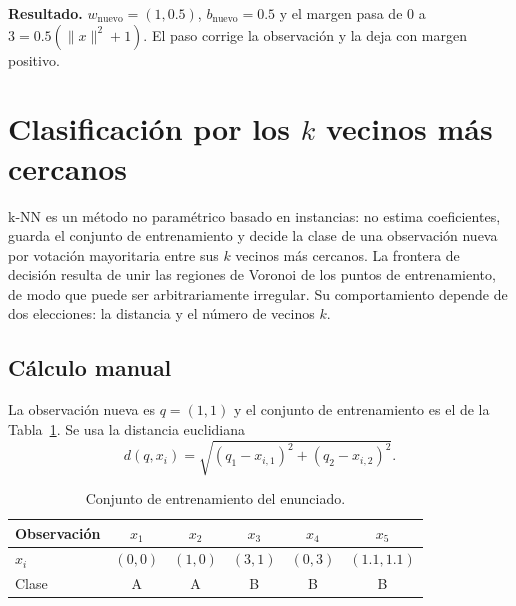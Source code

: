 \documentclass[12pt,a4paper]{article}
\newcommand{\norm}[1]{\lVert #1\rVert}
\begin{document}
\begin{cajaRes}
  \textbf{Resultado.} $w_{\text{nuevo}}=(1,0.5)$, $b_{\text{nuevo}}=0.5$ y el
  margen pasa de $0$ a $3=0.5(\norm{x}^2+1)$. El paso corrige la observación y
  la deja con margen positivo.
\end{cajaRes}

\section{Clasificación por los \texorpdfstring{$k$}{k} vecinos más cercanos}

k-NN es un método no paramétrico basado en instancias: no estima coeficientes,
guarda el conjunto de entrenamiento y decide la clase de una observación nueva
por votación mayoritaria entre sus $k$ vecinos más cercanos. La frontera de
decisión resulta de unir las regiones de Voronoi de los puntos de entrenamiento,
de modo que puede ser arbitrariamente irregular. Su comportamiento depende de
dos elecciones: la distancia y el número de vecinos $k$.

\subsection{Cálculo manual}

La observación nueva es $q=(1,1)$ y el conjunto de entrenamiento es el de la
Tabla~\ref{tab:knn}. Se usa la distancia euclidiana
\begin{equation}
  d(q,x_i)=\sqrt{(q_1-x_{i,1})^2+(q_2-x_{i,2})^2}.
  \label{eq:dist}
\end{equation}

\begin{table}[H]
  \centering
  \small
  \caption{Conjunto de entrenamiento del enunciado.}
  \label{tab:knn}
  \begin{tabular}{@{}lccccc@{}}
    \toprule
    Observación & $x_1$ & $x_2$ & $x_3$ & $x_4$ & $x_5$ \\
    \midrule
    $x_i$  & $(0,0)$ & $(1,0)$ & $(3,1)$ & $(0,3)$ & $(1.1,1.1)$ \\
    Clase  & A & A & B & B & B \\
    \bottomrule
  \end{tabular}
\end{table}
\end{document}
